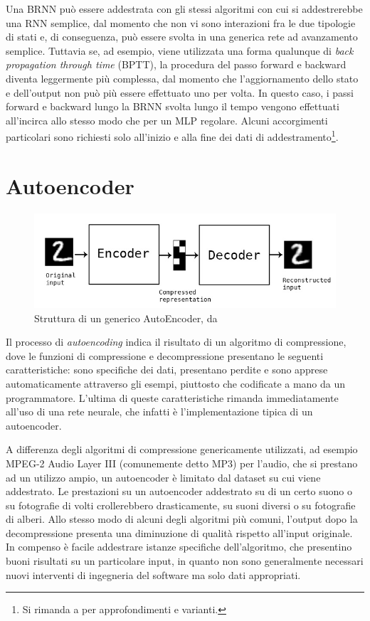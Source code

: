 Una BRNN può essere addestrata con gli stessi algoritmi con cui si addestrerebbe una RNN semplice, dal momento che non vi sono interazioni fra le due tipologie di stati e, di conseguenza, può essere svolta in una generica rete ad avanzamento semplice. Tuttavia se, ad esempio, viene utilizzata una forma qualunque di \textit{back propagation through time} (BPTT), la procedura del passo forward e backward diventa leggermente più complessa, dal momento che l'aggiornamento dello stato e dell'output non può più essere effettuato uno per volta. In questo caso, i passi forward e backward lungo la BRNN svolta lungo il tempo vengono effettuati all'incirca allo stesso modo che per un MLP regolare. Alcuni accorgimenti particolari sono richiesti solo all'inizio e alla fine dei dati di addestramento\footnote{Si rimanda a \cite{BRNN} per approfondimenti e varianti.}.
\section{Autoencoder}
\begin{figure}[ht]
	\centering
	\includegraphics[width=0.8\linewidth]{img/autoencoder_schema.jpg}
	\caption{Struttura di un generico AutoEncoder, da \cite{keras_blog}}
	\label{fig:1.12}
\end{figure}
Il processo di \textit{autoencoding} indica il risultato di un algoritmo di compressione, dove le funzioni di compressione e decompressione presentano le seguenti caratteristiche: sono specifiche dei dati, presentano perdite e sono apprese automaticamente attraverso gli esempi, piuttosto che codificate a mano da un programmatore. L'ultima di queste caratteristiche rimanda immediatamente all'uso di una rete neurale, che infatti è l'implementazione tipica di un autoencoder.

A differenza degli algoritmi di compressione genericamente utilizzati, ad esempio MPEG-2 Audio Layer III (comunemente detto MP3) per l'audio, che si prestano ad un utilizzo ampio, un autoencoder è limitato dal dataset su cui viene addestrato. Le prestazioni su un autoencoder addestrato su di un certo suono o su fotografie di volti crollerebbero drasticamente, su suoni diversi o su fotografie di alberi. Allo stesso modo di alcuni degli algoritmi più comuni, l'output dopo la decompressione presenta una diminuzione di qualità rispetto all'input originale. In compenso è facile addestrare istanze specifiche dell'algoritmo, che presentino buoni risultati su un particolare input, in quanto non sono generalmente necessari nuovi interventi di ingegneria del software ma solo dati appropriati.


